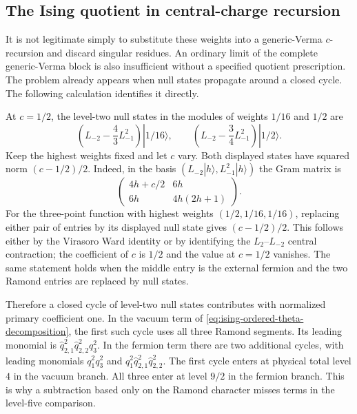 \subsection{The Ising quotient in central-charge recursion}

It is not legitimate simply to substitute these weights into a
generic-Verma $c$-recursion and discard singular residues.  An ordinary
limit of the complete generic-Verma block is also insufficient without
a specified quotient prescription.  The problem already appears when
null states propagate around a closed cycle.  The following calculation
identifies it directly.

At $c=1/2$, the level-two null states in the modules of weights $1/16$
and $1/2$ are
\begin{equation}
 \left(L_{-2}-\frac43L_{-1}^2\right)|1/16\rangle,
 \qquad
 \left(L_{-2}-\frac34L_{-1}^2\right)|1/2\rangle.
\end{equation}
Keep the highest weights fixed and let $c$ vary.  Both displayed
states have squared norm $(c-1/2)/2$.  Indeed, in the basis
$(L_{-2}|h\rangle,L_{-1}^2|h\rangle)$ the Gram matrix is
\begin{equation}
 \begin{pmatrix}
 4h+c/2&6h\\6h&4h(2h+1)
 \end{pmatrix}.
\end{equation}
For the three-point function with highest weights
$(1/2,1/16,1/16)$, replacing either pair of entries by its displayed
null state gives $(c-1/2)/2$.  This follows either by the Virasoro Ward
identity or by identifying the $L_2$--$L_{-2}$ central contraction;
the coefficient of $c$ is $1/2$ and the value at $c=1/2$ vanishes.
The same statement holds when the middle entry is the external fermion
and the two Ramond entries are replaced by null states.

Therefore a closed cycle of level-two null states contributes with
normalized primary coefficient one.  In the vacuum term of
\eqref{eq:ising-ordered-theta-decomposition}, the first such cycle
uses all three Ramond segments.  Its leading monomial is
$\hat q_{2,1}^{2}\hat q_{2,2}^{2}q_3^2$.  In the fermion term there
are two additional cycles, with leading monomials $q_1^2q_3^2$ and
$q_1^2\hat q_{2,1}^{2}\hat q_{2,2}^{2}$.  The first cycle enters
at physical total level $4$ in the vacuum branch.  All three enter
at level $9/2$ in the fermion branch.  This is why a subtraction based
only on the Ramond character misses terms in the level-five comparison.

